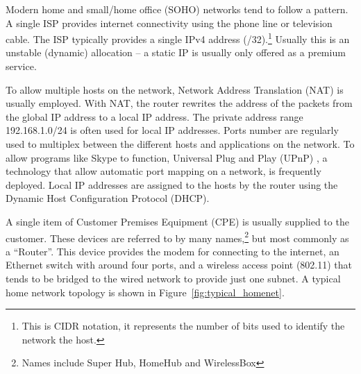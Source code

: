 \documentclass[12pt,a4paper,twoside]{report}
\begin{document}
Modern home and small/home office (SOHO)  networks tend to follow a pattern. A single ISP provides internet
connectivity using the phone line or television cable.  The ISP typically
provides a single IPv4 address (/32).\footnote{This is CIDR notation, it
represents the number of bits used to identify the network the host.} Usually
this is an unstable (dynamic) allocation -- a static IP is usually only offered
as a premium service. 

To allow multiple hosts on the network, Network Address Translation (NAT)
 is usually employed. With NAT,
the router rewrites the address of the packets from the global IP address to a
local IP address. The private address range 192.168.1.0/24 is often used for
local IP addresses. Ports number are regularly used to multiplex between the
different hosts and applications on the network. To allow programs like Skype
to function, Universal Plug and Play (UPnP) , a technology that allow automatic port mapping on a network, is
frequently deployed. Local IP addresses are assigned to the hosts by the router
using the Dynamic Host Configuration Protocol (DHCP). 

A single item of Customer Premises Equipment (CPE)  is usually supplied to the customer. These devices are
referred to by many names,\footnote{Names include Super Hub, HomeHub and
WirelessBox} but most commonly as a ``Router''.  This device provides the modem for
connecting to the internet, an Ethernet switch with around four ports, and a
wireless access point (802.11) that tends to be bridged to the wired network to
provide just one subnet. A typical home network topology is shown in
Figure~\ref{fig:typical_homenet}.
\end{document}
